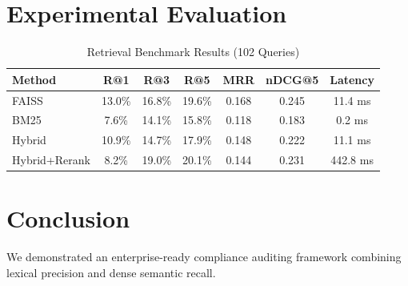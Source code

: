 \documentclass[10pt,journal,compsoc]{IEEEtran}
\begin{document}
\section{Experimental Evaluation}
\begin{table}[htbp]
\caption{Retrieval Benchmark Results (102 Queries)}
\begin{center}
\begin{tabular}{lcccccc}
\toprule
Method & R@1 & R@3 & R@5 & MRR & nDCG@5 & Latency \\
\midrule
FAISS & 13.0\% & 16.8\% & 19.6\% & 0.168 & 0.245 & 11.4 ms \\
BM25 & 7.6\% & 14.1\% & 15.8\% & 0.118 & 0.183 & 0.2 ms \\
Hybrid & 10.9\% & 14.7\% & 17.9\% & 0.148 & 0.222 & 11.1 ms \\
Hybrid+Rerank & 8.2\% & 19.0\% & 20.1\% & 0.144 & 0.231 & 442.8 ms \\
\bottomrule
\end{tabular}
\end{center}
\end{table}

\section{Conclusion}
We demonstrated an enterprise-ready compliance auditing framework combining lexical precision and dense semantic recall.



\end{document}
